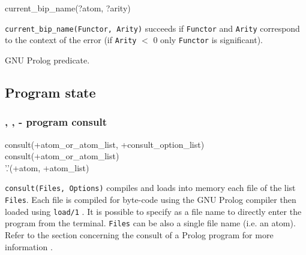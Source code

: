 \begin{TemplatesOneCol}
current\_bip\_name(?atom, ?arity)

\end{TemplatesOneCol}

\Description

\texttt{current\_bip\_name(Functor, Arity)} succeeds if \texttt{Functor} and
\texttt{Arity} correspond to the context of the error 
(if \texttt{Arity} $<$ 0 only \texttt{Functor} is significant).

\begin{PlErrors}



\end{PlErrors}

\Portability

GNU Prolog predicate.

\subsection{Program state}

\subsubsection{,\label{consult/1}
               ,
                - program consult}

\begin{TemplatesOneCol}
consult(+atom\_or\_atom\_list, +consult\_option\_list)\\
consult(+atom\_or\_atom\_list)\\
'.'(+atom, +atom\_list) \\

\end{TemplatesOneCol}

\Description

\texttt{consult(Files, Options)} compiles and loads into memory each file
of the list \texttt{Files}. Each file is compiled for byte-code using the
GNU Prolog compiler  then loaded using
\texttt{load/1} . It is possible to specify  as a
file name to directly enter the program from the terminal. \texttt{Files} can
be also a single file name (i.e. an atom). Refer to the section concerning
the consult of a Prolog program for more information
.

